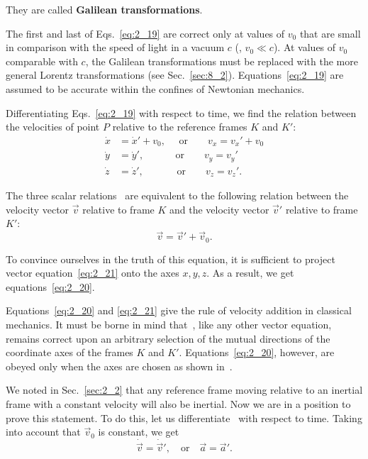 \noindent
They are called \textbf{Galilean transformations}.

The first and last of Eqs.~\eqref{eq:2_19} are correct only at values of $v_0$ that are small in comparison with the speed of light in a vacuum $c$ (\ie, $v_0\ll c$). At values of $v_0$ comparable with $c$, the Galilean transformations must be replaced with the more general Lorentz transformations (see Sec.~\ref{sec:8_2}). Equations~\eqref{eq:2_19} are assumed to be accurate within the confines of Newtonian mechanics.

Differentiating Eqs.~\eqref{eq:2_19} with respect to time, we find the relation between the velocities of point $P$ relative to the reference frames $K$ and $K'$:
\begin{align}
\dot{x} &= \dot{x}'+v_0, \quad\,\,\text{or}\quad\quad v_x=v_x'+v_0\nonumber\\
\dot{y} &= \dot{y}', \quad\quad\,\,\,\,\,\,\,\text{or}\quad\quad v_y=v_y'\label{eq:2_20}\\
\dot{z} &= \dot{z}', \quad\quad\,\,\,\,\,\,\,\,\text{or}\quad\quad v_z=v_z'.\nonumber
\end{align}

The three scalar relations~ are equivalent to the following relation between the velocity vector $\vec{v}$ relative to frame $K$ and the velocity vector $\vec{v}'$ relative to frame $K'$:
\begin{equation}\label{eq:2_21}
\vec{v} = \vec{v}' + \vec{v}_0.
\end{equation}

\noindent
To convince ourselves in the truth of this equation, it is sufficient to project vector equation~\eqref{eq:2_21} onto the axes $x, y, z$. As a result, we get equations~\eqref{eq:2_20}.

Equations~\eqref{eq:2_20} and \eqref{eq:2_21} give the rule of velocity addition in classical mechanics. It must be borne in mind that~, like any other vector equation, remains correct upon an arbitrary selection of the mutual directions of the coordinate axes of the frames $K$ and $K'$. Equations~\eqref{eq:2_20}, however, are obeyed only when the axes are chosen as shown in~.

We noted in Sec.~\ref{sec:2_2} that any reference frame moving relative to an inertial frame with a constant velocity will also be inertial. Now we are in a position to prove this statement. To do this, let us differentiate~ with respect to time. Taking into account that $\vec{v}_0$ is constant, we get
\begin{equation}\label{eq:2_22}
\dot{\vec{v}} = \dot{\vec{v}}', \quad\text{or}\quad  \vec{a} = \vec{a}'.
\end{equation}

